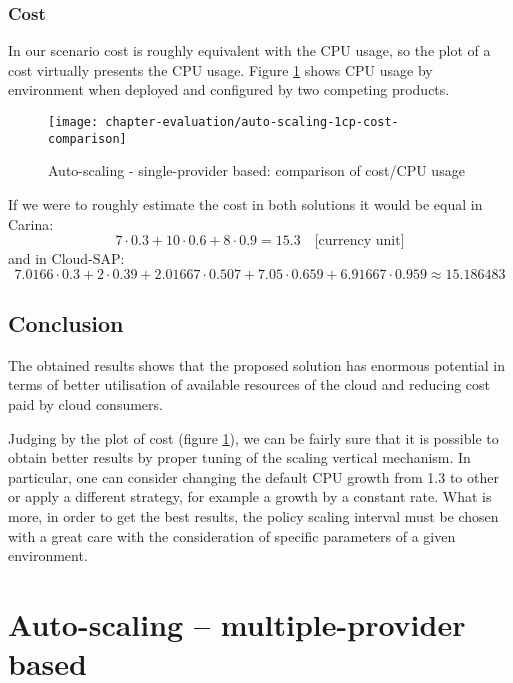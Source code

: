 \subsubsection*{Cost}
In our scenario cost is roughly equivalent with the CPU usage, so the plot of a cost virtually presents the CPU usage. Figure \ref{fig:auto-scaling-1cp-cost-comparison} shows CPU usage by environment when deployed and configured by two competing products.
\begin{figure}[!ht]
  \begin{center}
    \texttt{[image: chapter-evaluation/auto-scaling-1cp-cost-comparison]}
  \end{center}
  \caption{Auto-scaling - single-provider based: comparison of cost/CPU usage}
  \label{fig:auto-scaling-1cp-cost-comparison}
\end{figure}
If we were to roughly estimate the cost in both solutions it would be equal in Carina:
\begin{equation}
  7\cdot 0.3 + 10\cdot 0.6 + 8\cdot 0.9 = 15.3 \quad \text{[currency unit]}
\end{equation}
and in Cloud-SAP:
\begin{equation}
  7.0166\cdot 0.3 + 2\cdot 0.39 + 2.01667\cdot0.507 + 7.05\cdot 0.659 + 6.91667\cdot 0.959 \approx 15.186483
\end{equation}

\subsection*{Conclusion}
The obtained results shows that the proposed solution has enormous potential in terms of better utilisation of available resources of the cloud and reducing cost paid by cloud consumers.

Judging by the plot of cost (figure \ref{fig:auto-scaling-1cp-cost-comparison}), we can be fairly sure that it is possible to obtain better results by proper tuning of the scaling vertical mechanism. In particular, one can consider changing the default CPU growth from 1.3 to other or apply a different strategy, for example a growth by a constant rate. What is more, in order to get the best results, the policy scaling interval must be chosen with a great care with the consideration of specific parameters of a given environment.

\newpage
\section{Auto-scaling -- multiple-provider based}
